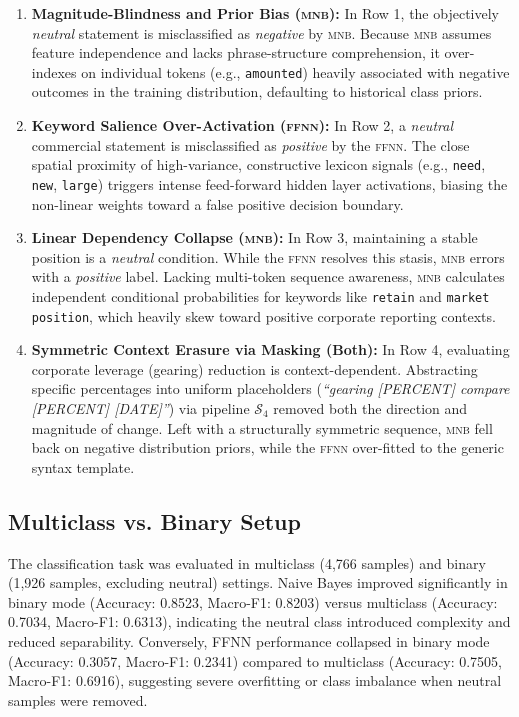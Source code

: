 \documentclass[manuscript,screen,review, nonacm]{acmart}
\begin{document}
\begin{enumerate}[leftmargin=*]
    \item \textbf{Magnitude-Blindness and Prior Bias (\textsc{mnb}):}
    In Row 1, the objectively \textit{neutral} statement is misclassified as \textit{negative} by \textsc{mnb}. Because \textsc{mnb} assumes feature independence and lacks phrase-structure comprehension, it over-indexes on individual tokens (e.g., \texttt{amounted}) heavily associated with negative outcomes in the training distribution, defaulting to historical class priors.

    \item \textbf{Keyword Salience Over-Activation (\textsc{ffnn}):}
    In Row 2, a \textit{neutral} commercial statement is misclassified as \textit{positive} by the \textsc{ffnn}. The close spatial proximity of high-variance, constructive lexicon signals (e.g., \texttt{need}, \texttt{new}, \texttt{large}) triggers intense feed-forward hidden layer activations, biasing the non-linear weights toward a false positive decision boundary.

    \item \textbf{Linear Dependency Collapse (\textsc{mnb}):}
    In Row 3, maintaining a stable position is a \textit{neutral} condition. While the \textsc{ffnn} resolves this stasis, \textsc{mnb} errors with a \textit{positive} label. Lacking multi-token sequence awareness, \textsc{mnb} calculates independent conditional probabilities for keywords like \texttt{retain} and \texttt{market position}, which heavily skew toward positive corporate reporting contexts.

    \item \textbf{Symmetric Context Erasure via Masking (Both):}
    In Row 4, evaluating corporate leverage (gearing) reduction is context-dependent. Abstracting specific percentages into uniform placeholders (\textit{``gearing [PERCENT] compare [PERCENT] [DATE]''}) via pipeline $\mathcal{S}_4$ removed both the direction and magnitude of change. Left with a structurally symmetric sequence, \textsc{mnb} fell back on negative distribution priors, while the \textsc{ffnn} over-fitted to the generic syntax template.
\end{enumerate}

\subsection{Multiclass vs. Binary Setup}
The classification task was evaluated in multiclass (4,766 samples) and binary (1,926 samples, excluding neutral) settings. Naive Bayes improved significantly in binary mode (Accuracy: 0.8523, Macro-F1: 0.8203) versus multiclass (Accuracy: 0.7034, Macro-F1: 0.6313), indicating the neutral class introduced complexity and reduced separability. Conversely, FFNN performance collapsed in binary mode (Accuracy: 0.3057, Macro-F1: 0.2341) compared to multiclass (Accuracy: 0.7505, Macro-F1: 0.6916), suggesting severe overfitting or class imbalance when neutral samples were removed.
\end{document}
